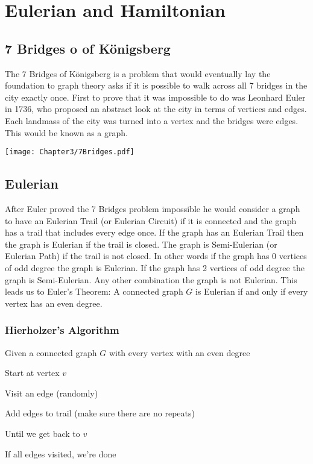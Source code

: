 \chapter{Eulerian and Hamiltonian}
\section{7 Bridges o of K\"{o}nigsberg}
The 7 Bridges of K\"{o}nigsberg is a problem that would eventually lay the foundation to graph theory asks if it is possible to walk across all 7 bridges in the city exactly once. First to prove that it was impossible to do was Leonhard Euler in 1736, who proposed an abstract look at the city in terms of vertices and edges. Each landmass of the city was turned into a vertex and the bridges were edges. This would be known as a graph.\cite{7Bridges}
  \begin{center}
  	\texttt{[image: Chapter3/7Bridges.pdf]}
  \end{center}

    \section{Eulerian}
  After Euler proved the 7 Bridges problem impossible he would consider a graph to have an Eulerian Trail (or Eulerian Circuit) if it is connected and the graph has a trail that includes every edge once. If the graph has an Eulerian Trail then the graph is Eulerian if the trail is closed. The graph is Semi-Eulerian (or Eulerian Path) if the trail is not closed. In other words if the graph has 0 vertices of odd degree the graph is Eulerian. If the graph has 2 vertices of odd degree the graph is Semi-Eulerian. Any other combination the graph is not Eulerian. This leads us to Euler's Theorem: A connected graph $G$ is Eulerian if and only if every vertex has an even degree.
  \subsection{Hierholzer's Algorithm}
  Given a connected graph $G$ with every vertex with an even degree 

  Start at vertex $v$

  Visit an edge (randomly)

  Add edges to trail (make sure there are no repeats)

  Until we get back to $v$

  If all edges visited, we're done

